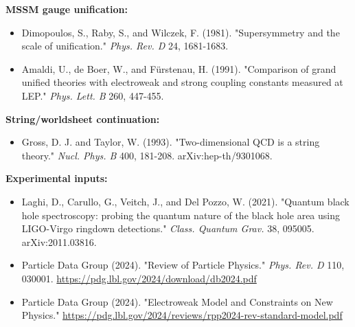 \textbf{MSSM gauge unification:}

\begin{itemize}
\tightlist
\item
  Dimopoulos, S., Raby, S., and Wilczek, F. (1981). "Supersymmetry and the scale of unification." \emph{Phys. Rev. D} 24, 1681-1683.
\item
  Amaldi, U., de Boer, W., and F\"{u}rstenau, H. (1991). "Comparison of grand unified theories with electroweak and strong coupling constants measured at LEP." \emph{Phys. Lett. B} 260, 447-455.
\end{itemize}

\textbf{String/worldsheet continuation:}

\begin{itemize}
\tightlist
\item
  Gross, D. J. and Taylor, W. (1993). "Two-dimensional QCD is a string theory." \emph{Nucl. Phys. B} 400, 181-208. arXiv:hep-th/9301068.
\end{itemize}

\textbf{Experimental inputs:}

\begin{itemize}
\tightlist
\item
  Laghi, D., Carullo, G., Veitch, J., and Del Pozzo, W. (2021). "Quantum black hole spectroscopy: probing the quantum nature of the black hole area using LIGO-Virgo ringdown detections." \emph{Class. Quantum Grav.} 38, 095005. arXiv:2011.03816.
\item
  Particle Data Group (2024). "Review of Particle Physics." \emph{Phys. Rev. D} 110, 030001. \url{https://pdg.lbl.gov/2024/download/db2024.pdf}
\item
  Particle Data Group (2024). "Electroweak Model and Constraints on New Physics." \url{https://pdg.lbl.gov/2024/reviews/rpp2024-rev-standard-model.pdf}
\end{itemize}
\fi
